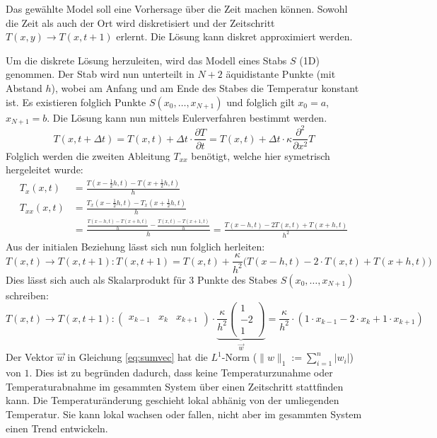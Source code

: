 Das gewählte Model soll eine Vorhersage über die Zeit machen können. Sowohl die Zeit als auch der Ort wird diskretisiert und der Zeitschritt $T(x,y) \rightarrow T(x,t+1)$ erlernt. Die Lösung kann diskret approximiert werden. 

Um die diskrete Lösung herzuleiten, wird das Modell eines Stabs $S$ (1D) genommen. Der Stab wird nun unterteilt in $N+2$ äquidistante Punkte (mit Abstand $h$), wobei am Anfang und am Ende des Stabes die Temperatur konstant ist. Es existieren folglich Punkte $S(x_0, \dots, x_{N+1})$ und folglich gilt $x_0 = a$, $x_{N+1} = b$. Die Lösung kann nun mittels Eulerverfahren bestimmt werden.
\begin{equation}
T(x,t+\Delta t) = T(x,t) + \Delta t \cdot  \frac{\partial T}{\partial t} = T(x,t) + \Delta t \cdot \kappa \frac{\partial^2}{\partial x^2} T
\end{equation}
Folglich werden die zweiten Ableitung $T_{xx}$ benötigt, welche hier symetrisch hergeleitet wurde:
\begin{align}
T_{x}(x, t)  &= \frac{T(x-\frac{1}{2}h, t) - T(x+\frac{1}{2}h, t)}{h}\\
T_{xx}(x, t) &= \frac{T_{x}(x-\frac{1}{2}h, t) - T_{x}(x+\frac{1}{2}h, t)}{h} \\
&= \frac{\frac{T(x-h, t) - T(x+h, t)}{h} - \frac{T(x, t) - T(x+1,t)}{h}}{h} = \frac{T(x-h, t) - 2 T(x, t) + T(x+h, t)}{h^{2}}
\end{align}	
Aus der initialen Beziehung lässt sich nun folglich herleiten:
\begin{equation}
T(x,t) \rightarrow T(x,t+1) : T(x,t+1) = T(x,t) + \frac{\kappa}{h^{2}} \Big( T(x-h,t) - 2 \cdot T(x,t) + T(x+h,t)  \Big)
\end{equation}
Dies lässt sich auch als Skalarprodukt für 3 Punkte des Stabes $S(x_0, \dots, x_{N+1})$ schreiben: 
\begin{equation}
T(x,t) \rightarrow T(x,t+1) : \begin{pmatrix} x_{k-1} & x_{k} & x_{k+1} \end{pmatrix} \cdot \underbrace{\frac{\kappa}{h^2} \begin{pmatrix} 1 \\ -2 \\ 1 \end{pmatrix}}_{\vec{w}} =  \frac{\kappa}{h^2} \cdot \left( 1 \cdot x_{k-1} - 2 \cdot x_{k} + 1 \cdot x_{k+1} \right)
\label{eq:sumvec}
\end{equation}
Der Vektor $\vec{w}$ in Gleichung \eqref{eq:sumvec} hat die $L^1$-Norm ($\|w\|_{1}:=\sum _{{i=1}}^{n}|w_{i}|$) von $1$. Dies ist zu begründen dadurch, dass keine Temperaturzunahme oder Temperaturabnahme im gesammten System über einen Zeitschritt stattfinden kann. Die Temperaturänderung geschieht lokal abhänig von der umliegenden Temperatur. Sie kann lokal wachsen oder fallen, nicht aber im gesammten System einen Trend entwickeln.

